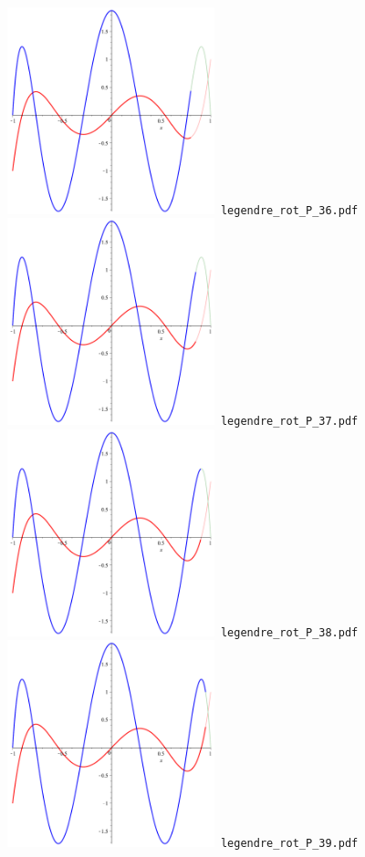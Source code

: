 \documentclass[a4paper]{amsart}
\begin{document}
\includegraphics[width=6cm]{legendre_rot_P_36.pdf}\verb+ legendre_rot_P_36.pdf+\\
\includegraphics[width=6cm]{legendre_rot_P_37.pdf}\verb+ legendre_rot_P_37.pdf+\\
\includegraphics[width=6cm]{legendre_rot_P_38.pdf}\verb+ legendre_rot_P_38.pdf+\\
\includegraphics[width=6cm]{legendre_rot_P_39.pdf}\verb+ legendre_rot_P_39.pdf+\\
\end{document}
